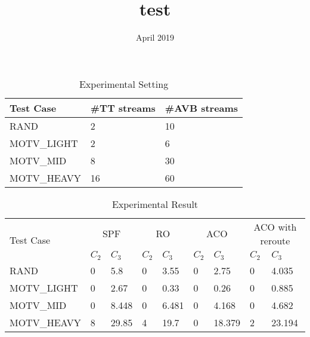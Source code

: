 \documentclass{article}
\title{test}
\date{April 2019}
\begin{document}
\begin{table}
	\begin{center}
		\begin{tabular}[t]{lll}
			\hline
			Test Case   & \#TT streams & \#AVB streams \\
			\hline
			RAND        &2             &10 \\
			\hline
			MOTV\_LIGHT &2             &6  \\
			\hline
			MOTV\_MID   &8             &30 \\
			\hline
			MOTV\_HEAVY &16            &60 \\
			\hline
		\end{tabular}
		\caption[Experimental Setting]{\small Experimental Setting } \label{t:expsetting}
	\end{center}
\end{table}

\begin{table}
	\begin{center}
		\begin{tabular}{l|llllllll}
			\hline
			\multirow{2}{*}{Test Case} &
			\multicolumn{2}{c}{SPF} &
			\multicolumn{2}{c}{RO} &
			\multicolumn{2}{c}{ACO} &
			\multicolumn{2}{c}{ACO with reroute} \\
			            & {$C_2$} & {$C_3$} & {$C_2$} & {$C_3$} & {$C_2$} & {$C_3$} & {$C_2$} & {$C_3$} \\
			\hline
			RAND        & 0       & 5.8     & 0       & 3.55    & 0       & 2.75    & 0       & 4.035   \\
			\hline
			MOTV\_LIGHT & 0       & 2.67    & 0       & 0.33    & 0       & 0.26    & 0       & 0.885   \\
			\hline
			MOTV\_MID   & 0       & 8.448   & 0       & 6.481   & 0       & 4.168   & 0       & 4.682   \\
			\hline
			MOTV\_HEAVY & 8       & 29.85   & 4       & 19.7    & 0       & 18.379  & 2       & 23.194  \\
			\hline
		\end{tabular}
		\caption[Experimental Result]{\small Experimental Result } \label{t:experiment}
	\end{center}
\end{table}
\end{document}
